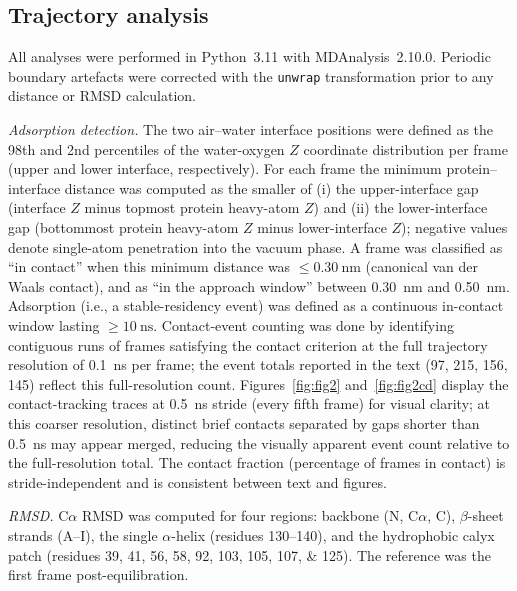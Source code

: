 \documentclass[11pt,a4paper]{article}
\begin{document}
\subsection*{Trajectory analysis}

All analyses were performed in Python~3.11 with
MDAnalysis~2.10.0\citep{MichaudAgrawal2011,Gowers2016}. Periodic
boundary artefacts were corrected with the \texttt{unwrap} transformation
prior to any distance or RMSD calculation.

\textit{Adsorption detection.} The two air--water interface positions
were defined as the 98th and 2nd percentiles of the water-oxygen $Z$
coordinate distribution per frame (upper and lower interface,
respectively). For each frame the minimum protein--interface distance
was computed as the smaller of (i) the upper-interface gap (interface
$Z$ minus topmost protein heavy-atom $Z$) and (ii) the lower-interface
gap (bottommost protein heavy-atom $Z$ minus lower-interface $Z$);
negative values denote single-atom penetration into the vacuum phase.
A frame was classified as ``in contact'' when this minimum distance was
$\leq \SI{0.30}{\nano\metre}$ (canonical van der Waals contact), and as
``in the approach window'' between \SI{0.30}{\nano\metre} and
\SI{0.50}{\nano\metre}. Adsorption (i.e., a stable-residency event) was
defined as a continuous in-contact window lasting
$\geq \SI{10}{\nano\second}$. Contact-event counting was done by
identifying contiguous runs of frames satisfying the contact criterion
at the full trajectory resolution of \SI{0.1}{\nano\second} per frame;
the event totals reported in the text (97, 215, 156, 145) reflect this full-resolution count.
Figures~\ref{fig:fig2} and~\ref{fig:fig2cd} display the contact-tracking traces at
\SI{0.5}{\nano\second} stride (every fifth frame) for visual clarity;
at this coarser resolution, distinct brief contacts separated by gaps
shorter than \SI{0.5}{\nano\second} may appear merged, reducing the
visually apparent event count relative to the full-resolution total.
The contact fraction (percentage of frames in contact) is stride-independent
and is consistent between text and figures.

\textit{RMSD.} C$\alpha$ RMSD was computed for four regions: backbone
(N, C$\alpha$, C), $\beta$-sheet strands (A--I), the single $\alpha$-helix
(residues 130--140), and the hydrophobic calyx patch
(residues \numlist{39;41;56;58;92;103;105;107;125}). The reference was
the first frame post-equilibration.
\end{document}
